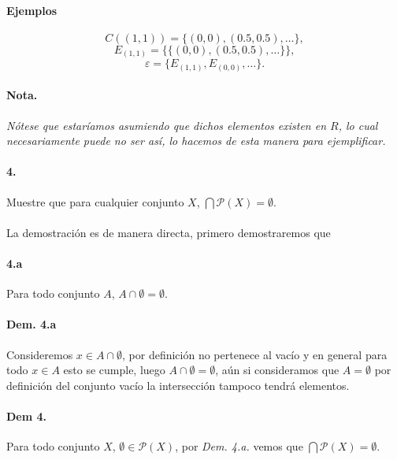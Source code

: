 \documentclass{article}
\begin{document}
\paragraph{Ejemplos}
$$C((1,1)) = \{(0,0),(0.5,0.5), \dots \},$$
$$E_{(1,1)} = \{\{(0,0),(0.5,0.5), \dots \}\},$$
$$\varepsilon = \{ E_{(1,1)}, E_{(0,0)}, \dots \}.$$
\paragraph{Nota.}\textit{Nótese que estaríamos asumiendo que dichos elementos existen en $R$, lo cual necesariamente puede no ser así, lo hacemos de esta manera para ejemplificar.}

\paragraph{4.} Muestre que para cualquier conjunto $X$, $\bigcap \mathcal{P}(X) = \emptyset$. 
\paragraph{}La demostración es de manera directa, primero demostraremos que 
\paragraph{4.a}Para todo conjunto $A$, $A \cap \emptyset = \emptyset.$
\paragraph{Dem. 4.a} Consideremos $x \in A \cap \emptyset$, por definición no pertenece al vacío y en general para todo $x \in A$ esto se cumple, luego $A \cap \emptyset = \emptyset$, aún si consideramos que $A = \emptyset$ por definición del conjunto vacío la intersección tampoco tendrá elementos.
	\paragraph{Dem 4.} Para todo conjunto $X$, $\emptyset \in \mathcal{P}(X)$, por \textit{Dem. 4.a.} vemos que $\bigcap \mathcal{P}(X) = \emptyset.$
\end{document}
